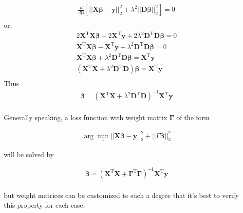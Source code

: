 \documentclass{article}
\newcommand{\y}{\mathbf{y}}
\newcommand{\X}{\mathbf{X}}
\newcommand{\B}{\boldsymbol\beta} %
\newcommand{\D}{\mathbf{D}}
\begin{document}
\begin{align*}
\frac{d}{d\B} \left[||\X\B-\y||_{2}^{2} + \lambda^2||\D \B||_{2}^{2} \right] = 0 \\
\end{align*}
or,
\begin{align*}
 2\X^{\textrm{T}}\X\B - 2\X^{\textrm{T}}\y + 2\lambda^2 \D^{\textrm{T}}\D\B = 0 \\
 \X^{\textrm{T}}\X\B - \X^{\textrm{T}}\y + \lambda^2 \D^{\textrm{T}}\D\B = 0 \\
 \X^{\textrm{T}}\X\B  + \lambda^2 \D^{\textrm{T}}\D\B = \X^{\textrm{T}}\y\\
  (\X^{\textrm{T}}\X  + \lambda^2 \D^{\textrm{T}}\D)\B = \X^{\textrm{T}}\y\\
\end{align*}
Thus
\begin{align*}
\B = (\X^{\textrm{T}}\X  + \lambda^2 \D^{\textrm{T}}\D)^{-1}\X^{\textrm{T}}\y\\
\end{align*}

Generally speaking, a loss function with weight matrix $\mathbf{\Gamma}$ of the form

\begin{align*}
\arg \min_{x}||\X\B-\y||_{2}^{2} + ||\textbf{$\Gamma$} \B||_{2}^{2}
\end{align*}

will be solved by 

\begin{align*}
\B = (\X^{\textrm{T}}\X  + \mathbf{\Gamma}^{\textrm{T}}\mathbf{\Gamma})^{-1}\X^{\textrm{T}}\y\\
\end{align*}

but weight matrices can be customized to such a degree that it's best to verify this property for each case. 
\end{document}
